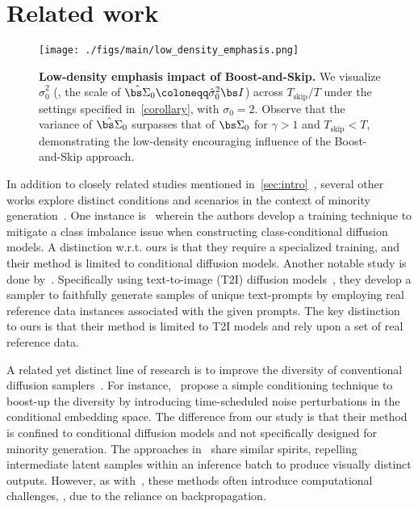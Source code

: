 \section{Related work}
\label{sec:related_work}

\setlength{\columnsep}{7.0pt}%
\begin{wrapfigure}[21]{r}{0.45\linewidth}
    \centering
   \vspace{-3mm}
    \texttt{[image: ./figs/main/low\_density\_emphasis.png]}
 \vspace{-7mm}
    \caption{\textbf{Low-density emphasis impact of Boost-and-Skip.} We visualize $\hat{\sigma}_0^2$ (\ie, the scale of $\hat{\bs \Sigma}_0 \coloneqq \hat{\sigma}_0^2 {\bs I}$) across $T_{\text{skip}} / T$ under the settings specified in~\cref{corollary}, with $\sigma_0 = 2$. Observe that the variance of $\hat{\bs \Sigma}_0$ surpasses that of ${\bs \Sigma}_0$ for $\gamma > 1$ and $T_{\text{skip}} < T$, demonstrating the low-density encouraging influence of the Boost-and-Skip approach.}
    \label{fig:hat_sigma_0_vs_T_s}
\end{wrapfigure}

In addition to closely related studies mentioned in~\cref{sec:intro}~\citep{sehwag2022generating, um2023don, um2024self, um2024minorityprompt}, several other works explore distinct conditions and scenarios in the context of minority generation~\cite{yu2020inclusive, lin2022raregan, qin2023class, huang2023enhanced, samuel2023all}. One instance is~\citet{qin2023class} wherein the authors develop a training technique to mitigate a class imbalance issue when constructing class-conditional diffusion models. A distinction w.r.t. ours is that they require a specialized training, and their method is limited to conditional diffusion models. Another notable study is done by~\citet{samuel2023all}. Specifically using text-to-image (T2I) diffusion models~\citep{rombach2022high}, they develop a sampler to faithfully generate samples of unique text-prompts by employing real reference data instances associated with the given prompts. The key distinction to ours is that their method is limited to T2I models and rely upon a set of real reference data. 

A related yet distinct line of research is to improve the diversity of conventional diffusion samplers~\citep{sadat2023cads, corso2023particle, lu2024procreate}. For instance,~\citet{sadat2023cads} propose a simple conditioning technique to boost-up the diversity by introducing time-scheduled noise perturbations in the conditional embedding space. The difference from our study is that their method is confined to conditional diffusion models and not specifically designed for minority generation. The approaches in~\citet{corso2023particle, lu2024procreate} share similar spirits, repelling intermediate latent samples within an inference batch to produce visually distinct outputs. However, as with~\citet{um2024self, um2024minorityprompt}, these methods often introduce computational challenges, \eg, due to the reliance on backpropagation.